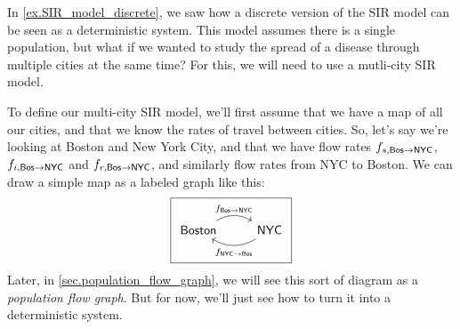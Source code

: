 \documentclass[DynamicalBook]{subfiles}
\begin{document}
\iffalse
\begin{example}\label{ex.multi_city_SIR_discrete}
  
  In \cref{ex.SIR_model_discrete}, we saw how a discrete version of the SIR
  model can be seen as a deterministic system. This model assumes there is a
  single population, but what if we wanted to study the spread of a disease
  through multiple cities at the same time? For this, we will need to use a
  mutli-city SIR model.

  To define our multi-city SIR model, we'll first assume that we have a map of
  all our cities, and that we know the rates of travel between cities. So, let's
  say we're looking at Boston and New York City, and that we have flow rates
  $f_{s,\mathsf{Bos}\to \mathsf{NYC}}$, $f_{i,\mathsf{Bos}\to \mathsf{NYC}}$ and
  $f_{r,\mathsf{Bos}\to \mathsf{NYC}}$, and similarly flow rates from NYC to Boston.
  We can draw a simple map as a labeled graph like this:
  \[
\begin{tikzpicture}
	\node[draw] {
  \begin{tikzcd}
    \Sys{Boston} \ar[r, bend left, "f_{\Sys{Bos} \to \Sys{NYC}}"]\ar[r, bend right, leftarrow, "f_{\Sys{NYC} \to \Sys{Bos}}"'] & \Sys{NYC}
  \end{tikzcd}
  };
\end{tikzpicture}
  \]
  Later, in \cref{sec.population_flow_graph}, we will see this sort of diagram
  as a \emph{population flow graph}. But for now, we'll just see how to turn it
  into a deterministic system.
  

\end{example}
\end{document}
